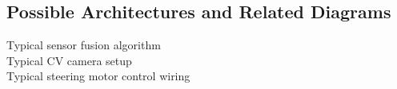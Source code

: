 \subsection{Possible Architectures and Related Diagrams}
\noindent Typical sensor fusion algorithm\\

\noindent Typical CV camera setup\\

\noindent Typical steering motor control wiring\\